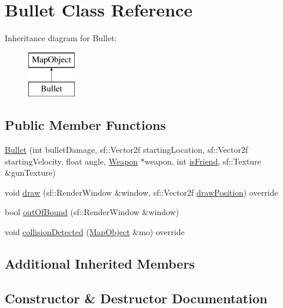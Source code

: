 \hypertarget{class_bullet}{}\section{Bullet Class Reference}
\label{class_bullet}
Inheritance diagram for Bullet\+:\begin{figure}[H]
\begin{center}
\leavevmode
\includegraphics[height=2.000000cm]{class_bullet}
\end{center}
\end{figure}
\subsection*{Public Member Functions}
\begin{DoxyCompactItemize}
\item 
\hyperlink{class_bullet_adc9ffce61bb50d8673bbfc31eab2157c}{Bullet} (int bullet\+Damage, sf\+::\+Vector2f starting\+Location, sf\+::\+Vector2f starting\+Velocity, float angle, \hyperlink{class_weapon}{Weapon} $\ast$weapon, int \hyperlink{class_map_object_ab2c08c54979e8457057f4d2dcdaae0fb}{is\+Friend}, sf\+::\+Texture \&gun\+Texture)
\item 
void \hyperlink{class_bullet_a8bc85503a787fdf10896b595d4ef7c27}{draw} (sf\+::\+Render\+Window \&window, sf\+::\+Vector2f \hyperlink{class_map_object_a3f383fa967b67989a1d30f8f9ff73936}{draw\+Position}) override
\item 
bool \hyperlink{class_bullet_ab634595581e7f0d91302ff060775b87a}{out\+Of\+Bound} (sf\+::\+Render\+Window \&window)
\item 
void \hyperlink{class_bullet_a96602619e212539b0b9b2ac4b159dc30}{collision\+Detected} (\hyperlink{class_map_object}{Map\+Object} \&mo) override
\end{DoxyCompactItemize}
\subsection*{Additional Inherited Members}


\subsection{Constructor \& Destructor Documentation}
\hypertarget{class_bullet_adc9ffce61bb50d8673bbfc31eab2157c}{}
